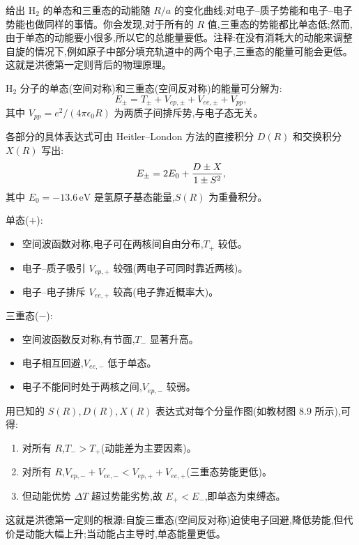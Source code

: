 \begin{question}
给出 $\mathrm{H}_2$ 的单态和三重态的动能随 $R/a$ 的变化曲线;对电子--质子势能和电子--电子势能也做同样的事情。你会发现,对于所有的 $R$ 值,三重态的势能都比单态低;然而,由于单态的动能要小很多,所以它的总能量要低。注释:在没有消耗大的动能来调整自旋的情况下,例如原子中部分填充轨道中的两个电子,三重态的能量可能会更低。这就是洪德第一定则背后的物理原理。
\end{question}
\begin{solution}
$\mathrm H_2$ 分子的单态(空间对称)和三重态(空间反对称)的能量可分解为:
\[
E_\pm=T_\pm+V_{ep,\pm}+V_{ee,\pm}+V_{pp},
\]
其中 $V_{pp}=e^2/(4\pi\epsilon_0R)$ 为两质子间排斥势,与电子态无关。

各部分的具体表达式可由 Heitler--London 方法的直接积分 $D(R)$ 和交换积分 $X(R)$ 写出:
\[
E_\pm=2E_0+{D\pm X\over1\pm S^2},
\]
其中 $E_0=-13.6\,\mathrm{eV}$ 是氢原子基态能量,$S(R)$ 为重叠积分。

单态($+$):
\begin{itemize}
\item 空间波函数对称,电子可在两核间自由分布,$T_+$ 较低。
\item 电子--质子吸引 $V_{ep,+}$ 较强(两电子可同时靠近两核)。
\item 电子--电子排斥 $V_{ee,+}$ 较高(电子靠近概率大)。
\end{itemize}
三重态($-$):
\begin{itemize}
\item 空间波函数反对称,有节面,$T_-$ 显著升高。
\item 电子相互回避,$V_{ee,-}$ 低于单态。
\item 电子不能同时处于两核之间,$V_{ep,-}$ 较弱。
\end{itemize}

用已知的 $S(R),D(R),X(R)$ 表达式对每个分量作图(如教材图 8.9 所示),可得:
\begin{enumerate}
\item 对所有 $R$,$T_- > T_+$(动能差为主要因素)。
\item 对所有 $R$,$V_{ep,-}+V_{ee,-} < V_{ep,+}+V_{ee,+}$(三重态势能更低)。
\item 但动能优势 $\Delta T$ 超过势能劣势,故 $E_+ < E_-$,即单态为束缚态。
\end{enumerate}
这就是洪德第一定则的根源:自旋三重态(空间反对称)迫使电子回避,降低势能,但代价是动能大幅上升;当动能占主导时,单态能量更低。
\end{solution}

